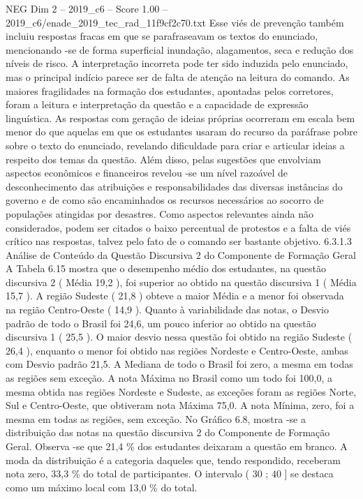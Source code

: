 \begin{textsample}{NEG Dim 2 – 2019\_c6 – Score 1.00 – 2019\_c6/enade\_2019\_tec\_rad\_11f9cf2c70.txt}
Esse viés de prevenção também incluiu respostas fracas em que se parafraseavam os textos do enunciado, mencionando -se de forma superficial inundação, alagamentos, seca e redução dos níveis de risco.
A interpretação incorreta pode ter sido induzida pelo enunciado, mas o principal indício parece ser de falta de atenção na leitura do comando.
As maiores fragilidades na formação dos estudantes, apontadas pelos corretores, foram a leitura e interpretação da questão e a capacidade de expressão linguística.
As respostas com geração de ideias próprias ocorreram em escala bem menor do que aquelas em que os estudantes usaram do recurso da paráfrase pobre sobre o texto do enunciado, revelando dificuldade para criar e articular ideias a respeito dos temas da questão.
Além disso, pelas sugestões que envolviam aspectos econômicos e financeiros revelou -se um nível razoável de desconhecimento das atribuições e responsabilidades das diversas instâncias do governo e de como são encaminhados os recursos necessários ao socorro de populações atingidas por desastres.
Como aspectos relevantes ainda não considerados, podem ser citados o baixo percentual de protestos e a falta de viés crítico nas respostas, talvez pelo fato de o comando ser bastante objetivo. 6.3.1.3 Análise de Conteúdo da Questão Discursiva 2 do Componente de Formação Geral A Tabela 6.15 mostra que o desempenho médio dos estudantes, na questão discursiva 2 ( Média 19,2 ), foi superior ao obtido na questão discursiva 1 ( Média 15,7 ).
A região Sudeste ( 21,8 ) obteve a maior Média e a menor foi observada na região Centro-Oeste ( 14,9 ).
Quanto à variabilidade das notas, o Desvio padrão de todo o Brasil foi 24,6, um pouco inferior ao obtido na questão discursiva 1 ( 25,5 ).
O maior desvio nessa questão foi obtido na região Sudeste ( 26,4 ), enquanto o menor foi obtido nas regiões Nordeste e Centro-Oeste, ambas com Desvio padrão 21,5.
A Mediana de todo o Brasil foi zero, a mesma em todas as regiões sem exceção.
A nota Máxima no Brasil como um todo foi 100,0, a mesma obtida nas regiões Nordeste e Sudeste, as exceções foram as regiões Norte, Sul e Centro-Oeste, que obtiveram nota Máxima 75,0.
A nota Mínima, zero, foi a mesma em todas as regiões, sem exceção.
No Gráfico 6.8, mostra -se a distribuição das notas na questão discursiva 2 do Componente de Formação Geral.
Observa -se que 21,4 \% dos estudantes deixaram a questão em branco.
A moda da distribuição é a categoria daqueles que, tendo respondido, receberam nota zero, 33,3 \% do total de participantes.
O intervalo ( 30 ; 40 ] se destaca como um máximo local com 13,0 \% do total.

\end{textsample}
